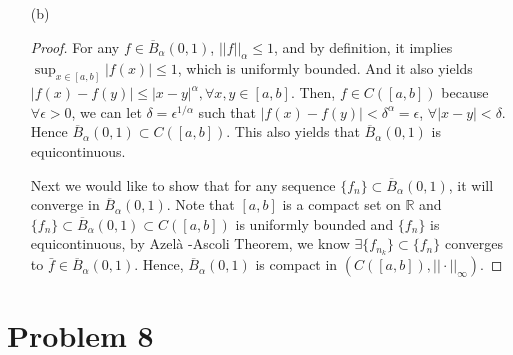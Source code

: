 \documentclass[12pt]{article}
\begin{document}
\begin{enumerate}
\item [(b)]

\begin{proof}

For any $f\in \overline{B}_\alpha(0, 1)$, $||f||_\alpha \leqslant 1$, and by definition, it implies $\sup_{x\in[a, b]}|f(x)| \leqslant 1$, which is uniformly bounded. And it also yields $|f(x) - f(y)| \leqslant |x-y|^\alpha, \forall x,y \in [a, b]$. Then, $f\in C([a, b])$ because $\forall \epsilon > 0$, we can let $\delta = \epsilon^{1/\alpha}$ such that $|f(x) - f(y)|< \delta^{\alpha} = \epsilon$, $\forall |x- y|<\delta$. Hence $\overline{B}_\alpha(0, 1) \subset C([a, b])$. This also yields that $\overline{B}_\alpha(0, 1)$ is equicontinuous.

Next we would like to show that for any sequence $\{f_n\}\subset \overline{B}_\alpha(0, 1)$, it will converge in $\overline{B}_\alpha(0, 1)$. Note that $[a, b]$ is a compact set on $\mathbb R$ and $\{f_n\}\subset \overline{B}_\alpha(0, 1)\subset C([a,b])$ is uniformly bounded and $\{f_n\}$ is equicontinuous, by Azel\`a -Ascoli Theorem, we know $\exists \{f_{n_k}\}\subset \{f_n\}$ converges to $\bar f \in \overline{B}_\alpha(0, 1)$. Hence, $\overline{B}_\alpha(0, 1)$ is compact in $\left(C([a, b]), ||\cdot||_\infty  \right)$.







\end{proof}



\end{enumerate}




\section*{Problem 8}
\end{document}
